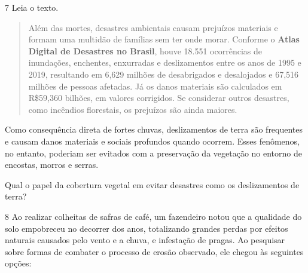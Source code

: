 \num{7} Leia o texto.

\begin{quote}
Além das mortes, desastres ambientais causam prejuízos materiais e
formam uma multidão de famílias sem ter onde morar. Conforme o
\textbf{Atlas Digital de Desastres no Brasil}, houve 18.551 ocorrências
de inundações, enchentes, enxurradas e deslizamentos entre os anos de
1995 e 2019, resultando em 6,629 milhões de desabrigados e desalojados e
67,516 milhões de pessoas afetadas. Já os danos materiais são calculados
em R\$59,360 bilhões, em valores corrigidos. Se considerar outros
desastres, como incêndios florestais, os prejuízos são ainda maiores.

\end{quote}

Como consequência direta de fortes chuvas, deslizamentos de terra são
frequentes e causam danos materiais e sociais profundos quando ocorrem.
Esses fenômenos, no entanto, poderiam ser evitados com a preservação da
vegetação no entorno de encostas, morros e serras.

Qual o papel da cobertura vegetal em evitar desastres como os
deslizamentos de terra?


\num{8} Ao realizar colheitas de safras de café, um fazendeiro
notou que a qualidade do solo empobreceu no decorrer dos anos,
totalizando grandes perdas por efeitos naturais causados pelo vento e a
chuva, e infestação de pragas. Ao pesquisar sobre formas de combater o
processo de erosão observado, ele chegou às seguintes opções:\medskip


